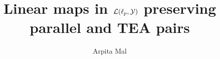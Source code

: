 \documentclass{amsart}
\theoremstyle{definition}
\theoremstyle{remark}
\numberwithin{equation}{section}
\begin{document}
	
	
	\title[ Linear maps in $\mathcal{L}(\ell_{\MakeLowercase{p}},\mathcal{Y})$ preserving parallel and TEA pairs] {{ Linear maps in $\mathcal{L}(\ell_{\MakeLowercase{p}},\mathcal{Y}) $ preserving parallel and TEA pairs}}

	
\author[Arpita Mal]{Arpita Mal}

\address[]{Dhirubhai Ambani University\\ Gandhinagar-382007\\ India.}






\end{document}
